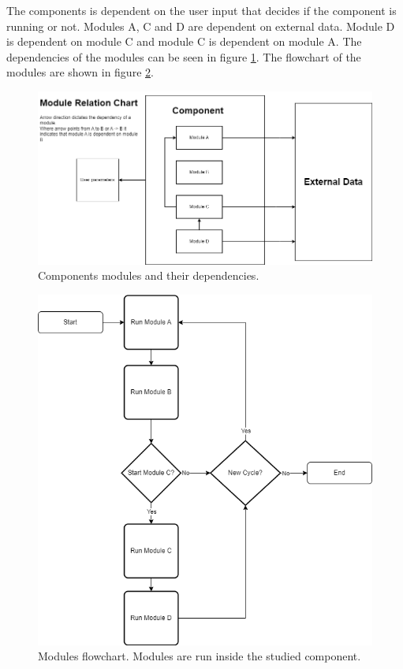 The components is dependent on the user input that decides if the component is running or not.
Modules A, C and D are dependent on external data.
Module D is dependent on module C and module C is dependent on module A.
The dependencies of the modules can be seen in figure \ref{figure:module:relation}.
The flowchart of the modules are shown in figure \ref{figure:module:flow}.

\begin{figure}
    \includegraphics[width=\textwidth]{images/modules_relation_uml.png}
    \caption{Components modules and their dependencies.}
    \label{figure:module:relation}
\end{figure}


\begin{figure}
    \includegraphics[width=\textwidth]{images/module_flow_chart.png}
    \caption{Modules flowchart. Modules are run inside the studied component.}
    \label{figure:module:flow}
\end{figure}

